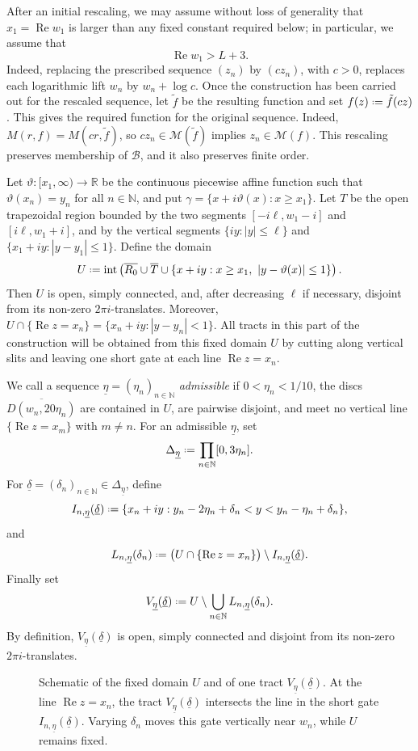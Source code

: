 \documentclass[a4paper, 11pt, reqno]{amsart}
\numberwithin{equation}{section}
\theoremstyle{plain}
\newcommand*{\defeq}{\mathrel{\vcenter{\baselineskip0.5ex \lineskiplimit0pt
 \hbox{\scriptsize.}\hbox{\scriptsize.}}}=}
\theoremstyle{remark}
\newcommand{\R}{{\mathbb{R}}}
\newcommand{\N}{{\mathbb{N}}}
\newcommand{\M}{{\mathcal{M}}}
\newcommand{\B}{{\mathcal{B}}}
\newcommand{\uldelta}{\underline{\delta}}
\newcommand{\uleta}{\underline{\eta}}
\newcommand{\Rea}{\operatorname{Re }}
\begin{document}
After an initial rescaling, we may assume without loss of generality that \(x_1=\Rea w_1\) is larger than any fixed constant required below; in particular, we assume that
\[
\Rea w_1>L+3.
\]
Indeed, replacing the prescribed sequence \((z_n)\) by \((cz_n)\), with \(c>0\), replaces each logarithmic lift \(w_n\) by \(w_n+\log c\). Once the construction has been carried out for the rescaled sequence, let \(\tilde{f}\) be the resulting function and set \(f(z)\defeq \tilde{f}(cz)\). This gives the required function for the original sequence. Indeed, \(M(r,f)=M(cr,\tilde{f})\), so \(cz_n\in\M(\tilde{f})\) implies \(z_n\in\M(f)\). This rescaling preserves membership of \(\B\), and it also preserves finite order.

Let \(\vartheta:[x_1,\infty)\to\R\) be the continuous piecewise affine
function such that \(\vartheta(x_n)=y_n\) for all \(n\in\N\), and put
$
\gamma=\{x+i\vartheta(x):x\ge x_1\}.
$
Let \(T\) be the open trapezoidal region bounded by the two segments
\([-i\ell,w_1-i]\) and \([i\ell,w_1+i]\), and by the vertical segments
\(\{iy:|y|\le\ell\}\) and \(\{x_1+iy:|y-y_1|\le1\}\).
Define the domain
\[
U\defeq \operatorname{int}\left(
\overline{R_0}\cup\overline T\cup
\{x+iy:x\ge x_1,\ |y-\vartheta(x)|\le1\}
\right).
\]
Then \(U\) is open, simply connected, and, after decreasing \(\ell\) if
necessary, disjoint from its non-zero \(2\pi i\)-translates. Moreover,
$
U\cap\{\Rea z=x_n\}=\{x_n+iy:|y-y_n|<1\}.
$
All tracts in this part of the construction will be obtained from this fixed domain \(U\) by cutting along vertical slits and leaving one short gate at each line \(\Rea z=x_n\).

We call a sequence \(\uleta=(\eta_n)_{n\in\N}\) \emph{admissible} if \(0<\eta_n<1/10\), the discs \(\overline{D(w_n,20\eta_n)}\) are contained in \(U\), are pairwise disjoint, and meet no vertical line \(\{\Rea z=x_m\}\) with \(m\ne n\). For an admissible \(\uleta\), set
\[
\Delta_{\uleta}\defeq\prod_{n\in\N}[0,3\eta_n].
\]
For \(\uldelta=(\delta_n)_{n\in\N}\in\Delta_{\uleta}\), define
\[
I_{n,\uleta}(\uldelta)
\defeq
\{x_n+iy:y_n-2\eta_n+\delta_n<y<y_n-\eta_n+\delta_n\},
\]
and
\[
L_{n,\uleta}(\delta_n)
\defeq
\bigl(U\cap\{\Rea z=x_n\}\bigr)\setminus I_{n,\uleta}(\uldelta).
\]
Finally set
\[
V_{\uleta}(\uldelta)\defeq U\setminus\bigcup_{n\in\N}L_{n,\uleta}(\delta_n).
\]
By definition, \(V_{\uleta}(\uldelta)\) is open, simply connected and disjoint from its non-zero \(2\pi i\)-translates. 

\begin{figure}[htp]
	\centering
	\def\svgwidth{0.9\linewidth}
	
	\caption{Schematic of the fixed domain \(U\) and of one tract
		\(V_{\uleta}(\uldelta)\). At the line \(\Rea z=x_n\), the tract
		\(V_{\uleta}(\uldelta)\) intersects the line in the short gate
		\(I_{n,\uleta}(\uldelta)\). Varying
		\(\delta_n\) moves this gate vertically near \(w_n\), while \(U\) remains
		fixed.} \label{fig:tract_points}
\end{figure}
\end{document}
